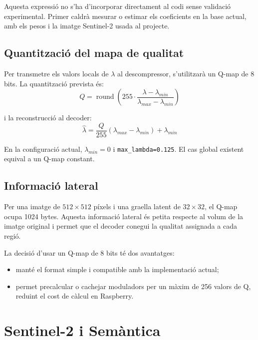 \documentclass[11pt,a4paper]{article}
\begin{document}
Aquesta expressió no s'ha d'incorporar directament al codi sense validació experimental. Primer caldrà mesurar o estimar els coeficients en la base actual, amb els pesos i la imatge Sentinel-2 usada al projecte.

\subsection{Quantització del mapa de qualitat}

Per transmetre els valors locals de $\lambda$ al descompressor, s'utilitzarà un Q-map de 8 bits. La quantització prevista és:
\begin{equation}
  Q =
  \operatorname{round}
  \left(
    255 \cdot
    \frac{\lambda - \lambda_{min}}
    {\lambda_{max} - \lambda_{min}}
  \right)
\end{equation}

i la reconstrucció al decoder:
\begin{equation}
  \hat{\lambda} =
  \frac{Q}{255}
  (\lambda_{max} - \lambda_{min}) + \lambda_{min}
\end{equation}

En la configuració actual, $\lambda_{min}=0$ i \texttt{max\_lambda=0.125}. El cas global existent equival a un Q-map constant.

\subsection{Informació lateral}

Per una imatge de $512 \times 512$ píxels i una graella latent de $32 \times 32$, el Q-map ocupa 1024 bytes. Aquesta informació lateral és petita respecte al volum de la imatge original i permet que el decoder conegui la qualitat assignada a cada regió.

La decisió d'usar un Q-map de 8 bits té dos avantatges:
\begin{itemize}
  \item manté el format simple i compatible amb la implementació actual;
  \item permet precalcular o cachejar moduladors per un màxim de 256 valors de Q, reduint el cost de càlcul en Raspberry.
\end{itemize}

\section{Sentinel-2 i Semàntica}
\end{document}
